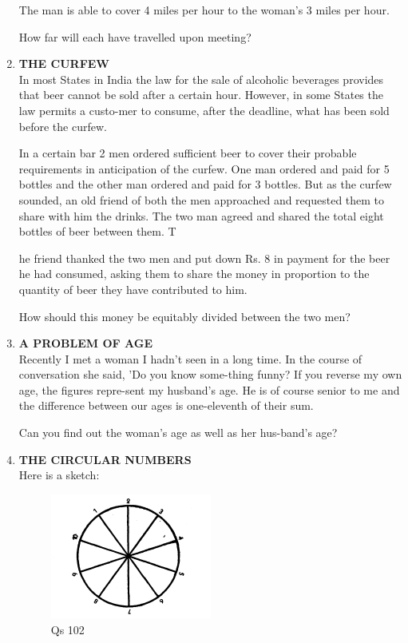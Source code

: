 \documentclass[12pt]{article}
\begin{document}
\begin{enumerate}
The man  is able  to cover  4 miles  per  hour  to the woman's  3 miles  per hour. 

How  far will each  have  travelled  upon  meeting?
%
\item \textbf{THE  CURFEW} \\
In most  States  in India  the  law for the sale  of alcoholic beverages  provides  that  beer  cannot  be sold  after  a certain hour.  However,  in some  States  the law permits  a custo-mer to consume,  after  the deadline,  what  has  been  sold before  the curfew. 

In a certain  bar 2 men  ordered  sufficient  beer  to cover their probable  requirements  in anticipation  of the  curfew. One man  ordered  and  paid  for  5 bottles  and the other man ordered  and  paid  for 3 bottles.  But  as the  curfew sounded,  an old  friend  of both  the men  approached  and requested  them  to share  with  him  the  drinks.  The  two man agreed  and shared  the total  eight  bottles  of beer  between  them. T

he friend  thanked  the two men  and  put  down  Rs. 8 in payment  for the beer  he had consumed,  asking  them  to share  the money  in proportion  to the quantity  of beer  they have  contributed  to him. 

How  should  this money  be equitably  divided  between the two men?
%
\item \textbf{A  PROBLEM  OF AGE} \\
Recently  I met a woman  I hadn't  seen  in a long  time.  In the course  of conversation  she said,  'Do  you know  some-thing  funny?  If you reverse  my own  age,  the figures  repre-sent my husband's  age.  He is of course  senior  to me and the difference  between  our ages  is one-eleventh  of their  sum. 

Can you find  out the woman's  age as well  as her hus-band's  age? 

\item \textbf{THE  CIRCULAR  NUMBERS} \\
Here  is a sketch: 

\begin{figure}[h]
\begin{center}
\includegraphics[width=0.5\textwidth]{images/sdevi_q102.png}
\caption{ Qs 102}
\end{center}
\end{figure}


\end{enumerate}
\end{document}
